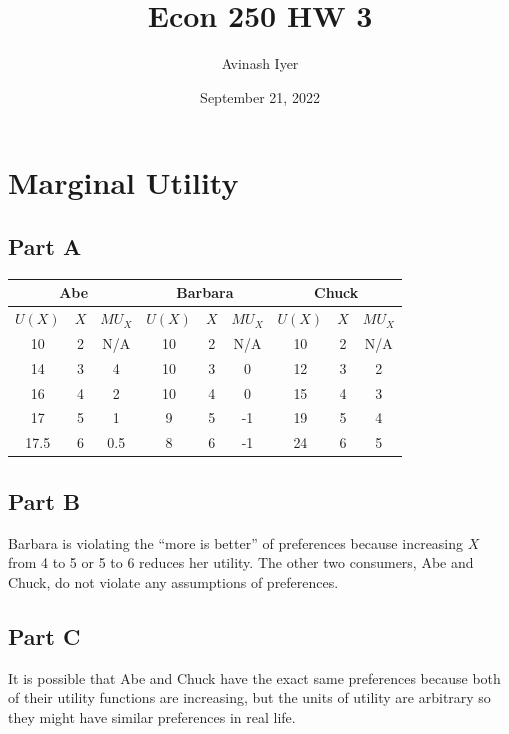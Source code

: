 \documentclass[8pt]{extarticle}
\title{Econ 250 HW 3}
\author{Avinash Iyer}
\date{September 21, 2022}
\begin{document}
{
\renewcommand{\arraystretch}{2}
\maketitle
\section{Marginal Utility}
\subsection*{Part A}
\begin{center}
	\begin{tabular}{|c|c|c|c|c|c|c|c|c|}
		\hline
		\multicolumn{3}{|c|}{Abe} & \multicolumn{3}{|c|}{Barbara} & \multicolumn{3}{|c|}{Chuck}\\
		\hline
		$U(X)$ & $X$ & $MU_X$ & $U(X)$ & $X$ & $MU_X$ & $U(X)$ & $X$ & $MU_X$ \\
		\hline
		10 & 2 & N/A & 10 & 2 & N/A & 10 & 2 & N/A \\
		\hline
		14 & 3 & 4 & 10 & 3 & 0 & 12 & 3 & 2 \\
		\hline
		16 & 4 & 2 & 10 & 4 & 0 & 15 & 4 & 3\\
		\hline
		17 & 5 & 1 & 9 & 5 & -1 & 19 & 5 & 4\\
		\hline
		17.5 & 6 & 0.5 & 8 & 6 & -1 & 24 & 6 & 5\\
		\hline
	\end{tabular}
\end{center}
\subsection*{Part B}
Barbara is violating the ``more is better'' of preferences because increasing $X$ from 4 to 5 or 5 to 6 reduces her utility. The other two consumers, Abe and Chuck, do not violate any assumptions of preferences.
\subsection*{Part C}
It is possible that Abe and Chuck have the exact same preferences because both of their utility functions are increasing, but the units of utility are arbitrary so they might have similar preferences in real life.
}
\end{document}
